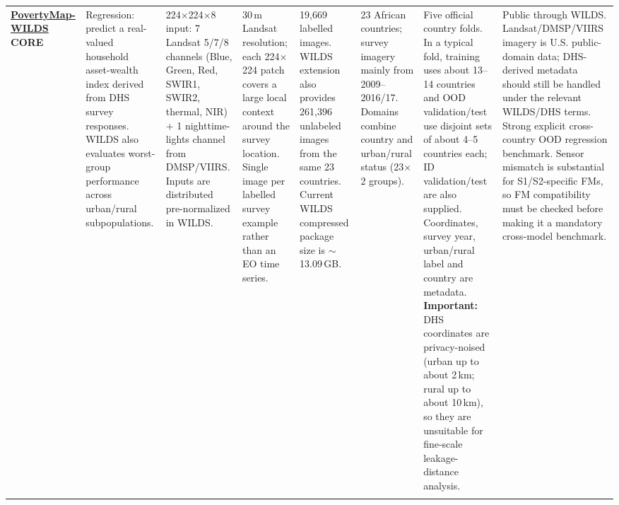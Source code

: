 \begin{landscape}
\begin{longtable}{
    Q{1.8cm}
    Q{2.5cm}
    Q{3.0cm}
    Q{2.5cm}
    Q{2.1cm}
    Q{3.0cm}
    Q{3.4cm}
    Q{3.4cm}
}
\href{https://wilds.stanford.edu/datasets/}{\textbf{PovertyMap-WILDS}}\newline
\textbf{CORE}
&
Regression: predict a real-valued household asset-wealth index derived from DHS survey responses. WILDS also evaluates worst-group performance across urban/rural subpopulations.
&
224$\times$224$\times$8 input: 7 Landsat 5/7/8 channels (Blue, Green, Red, SWIR1, SWIR2, thermal, NIR) + 1 nighttime-lights channel from DMSP/VIIRS. Inputs are distributed pre-normalized in WILDS.
&
30\,m Landsat resolution; each 224$\times$224 patch covers a large local context around the survey location. Single image per labelled survey example rather than an EO time series.
&
19,669 labelled images. WILDS extension also provides 261,396 unlabeled images from the same 23 countries. Current WILDS compressed package size is $\sim$13.09\,GB.
&
23 African countries; survey imagery mainly from 2009--2016/17. Domains combine country and urban/rural status (23$\times$2 groups).
&
Five official country folds. In a typical fold, training uses about 13--14 countries and OOD validation/test use disjoint sets of about 4--5 countries each; ID validation/test are also supplied. Coordinates, survey year, urban/rural label and country are metadata. \textbf{Important:} DHS coordinates are privacy-noised (urban up to about 2\,km; rural up to about 10\,km), so they are unsuitable for fine-scale leakage-distance analysis.
&
Public through WILDS. Landsat/DMSP/VIIRS imagery is U.S. public-domain data; DHS-derived metadata should still be handled under the relevant WILDS/DHS terms. Strong explicit cross-country OOD regression benchmark. Sensor mismatch is substantial for S1/S2-specific FMs, so FM compatibility must be checked before making it a mandatory cross-model benchmark.
\\
\addlinespace


\end{longtable}
\end{landscape}
